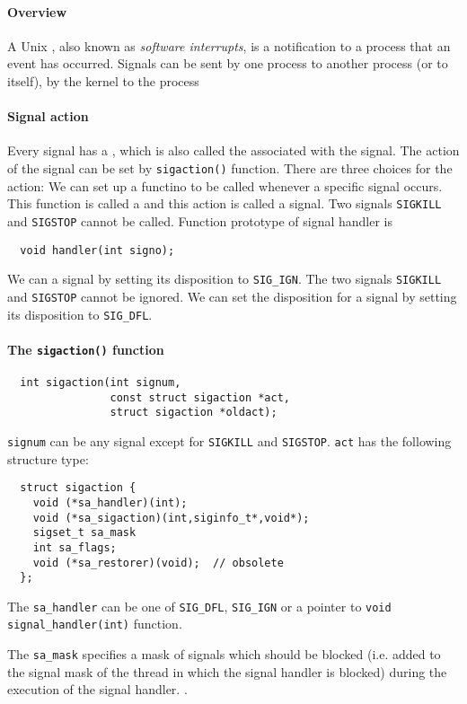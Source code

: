 \documentclass{memo}
\begin{document}
\small
{}

\paragraph{Overview} 
A Unix , also known as {\em software interrupts\/}, is a
notification to a process that an event has occurred.  Signals can be sent
\bit
\w by one process to another process (or to itself),
\w by the kernel to the process
\eit

\paragraph{Signal action}
Every signal has a , which is also called the 
associated with the signal. The action of the signal can be set by
\verb+sigaction()+ function. There are three choices for the action:
\ben
\w We can set up a functino to be called whenever a specific signal
occurs. This function is called a  and this action is
called  a signal. Two signals \verb+SIGKILL+ and \verb+SIGSTOP+
cannot be called. Function prototype of signal handler is
  \begin{verbatim}
  void handler(int signo);
  \end{verbatim}
\w We can  a signal by setting its disposition to
\verb+SIG_IGN+. The two signals \verb+SIGKILL+ and \verb+SIGSTOP+ cannot be
ignored. 
\w We can set the  disposition for a signal by setting its
disposition to \verb+SIG_DFL+. 
\een

\paragraph{The {\tt sigaction()} function}
\begin{verbatim}
  int sigaction(int signum, 
                const struct sigaction *act,
                struct sigaction *oldact);
\end{verbatim}
\verb+signum+ can be any signal except for \verb+SIGKILL+ and \verb+SIGSTOP+.
\verb+act+ has the following structure type:
\begin{verbatim}
  struct sigaction { 
    void (*sa_handler)(int);
    void (*sa_sigaction)(int,siginfo_t*,void*);
    sigset_t sa_mask
    int sa_flags;
    void (*sa_restorer)(void);  // obsolete
  };
\end{verbatim}
The \verb+sa_handler+ can be one of \verb+SIG_DFL+, \verb+SIG_IGN+ or a
pointer to \verb+void signal_handler(int)+ function.

The \verb+sa_mask+ specifies a mask of signals which should be blocked
(i.e. added to the signal mask of the thread in which the signal handler is
blocked) during the execution of the signal handler. . 
\end{document}
